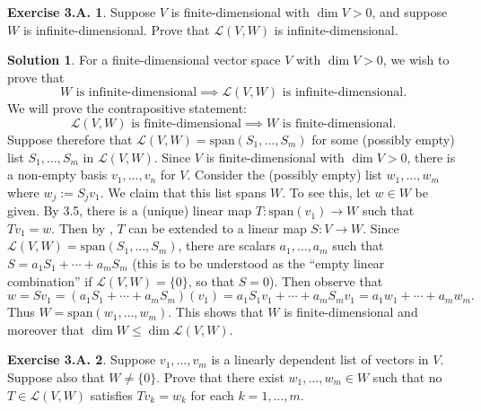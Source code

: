 \documentclass[12pt]{article}
\theoremstyle{definition}
\theoremstyle{exercise}
\newtheorem{exercise}{Exercise 3.A.}
\theoremstyle{solution}
\newtheorem*{solution}{Solution}
\newcommand{\lmap}{\mathcal{L}}
\newcommand{\Span}{\text{span}}
\begin{document}
\begin{exercise}
\label{ex:12}
    Suppose \( V \) is finite-dimensional with \( \dim V > 0 \), and suppose \( W \) is infinite-dimensional. Prove that \( \lmap(V, W) \) is infinite-dimensional.
\end{exercise}

\begin{solution}
    For a finite-dimensional vector space \( V \) with \( \dim V > 0 \), we wish to prove that
    \[
        W \text{ is infinite-dimensional} \implies \lmap(V, W) \text{ is infinite-dimensional.}
    \]
    We will prove the contrapositive statement:
    \[
        \lmap(V, W) \text{ is finite-dimensional} \implies W \text{ is finite-dimensional.}
    \]
    Suppose therefore that \( \lmap(V, W) = \Span(S_1, \ldots, S_m) \) for some (possibly empty) list \( S_1, \ldots, S_m \) in \( \lmap(V, W) \). Since \( V \) is finite-dimensional with \( \dim V > 0 \), there is a non-empty basis \( v_1, \ldots, v_n \) for \( V \). Consider the (possibly empty) list \( w_1, \ldots, w_m \) where \( w_j := S_j v_1 \). We claim that this list spans \( W \). To see this, let \( w \in W \) be given. By 3.5, there is a (unique) linear map \( T : \Span(v_1) \to W \) such that \( T v_1 = w \). Then by , \( T \) can be extended to a linear map \( S : V \to W \). Since \( \lmap(V, W) = \Span(S_1, \ldots, S_m) \), there are scalars \( a_1, \ldots, a_m \) such that \( S = a_1 S_1 + \cdots + a_m S_m \) (this is to be understood as the ``empty linear combination'' if \( \lmap(V, W) = \{ 0 \} \), so that \( S = 0 \)). Then observe that
    \[
        w = S v_1 = (a_1 S_1 + \cdots + a_m S_m)(v_1) = a_1 S_1 v_1 + \cdots + a_m S_m v_1 = a_1 w_1 + \cdots + a_m w_m.
    \]
    Thus \( W = \Span(w_1, \ldots, w_m) \). This shows that \( W \) is finite-dimensional and moreover that \( \dim W \leq \dim \lmap(V, W) \).
\end{solution}

\begin{exercise}
\label{ex:13}
    Suppose \( v_1, \ldots, v_m \) is a linearly dependent list of vectors in \( V \). Suppose also that \( W \neq \{ 0 \} \). Prove that there exist \( w_1, \ldots, w_m \in W \) such that no \( T \in \lmap(V, W) \) satisfies \( T v_k = w_k \) for each \( k = 1, \ldots, m \).
\end{exercise}
\end{document}
